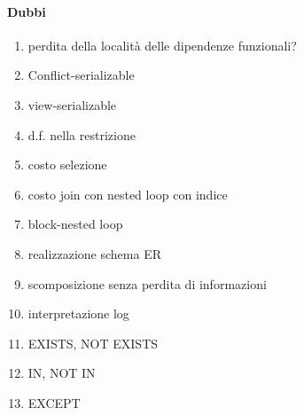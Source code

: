 \documentclass{exam}
\begin{document}
\paragraph{Dubbi}
\begin{enumerate}
    \item perdita della località delle dipendenze funzionali?
    \item Conflict-serializable
    \item view-serializable
    \item d.f. nella restrizione
    \item costo selezione
    \item costo join con nested loop con indice
    \item block-nested loop
    \item realizzazione schema ER
    \item scomposizione senza perdita di informazioni
    \item interpretazione log
    \item EXISTS, NOT EXISTS
    \item IN, NOT IN
    \item EXCEPT
\end{enumerate}
\end{document}
